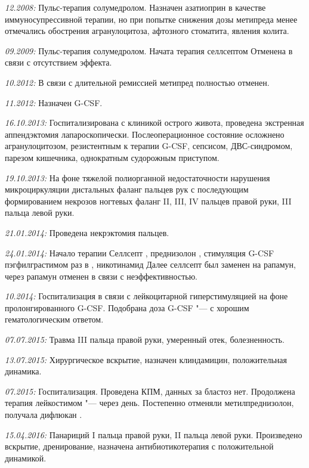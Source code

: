 \documentclass[a4paper,14pt]{extarticle}
\newcommand{\mug}{мкг}
\newcommand{\mgpkg}{мг/кг}
\newcommand{\mgpd}{мг/сут.}
\newcommand{\mugpkg}{мкг/кг}
\newcommand{\months}{мес.}
\newcommand{\weeks}{нед.}
\newcommand{\pdate}[1]{\emph{#1:} }
\begin{document}
\pdate{12.2008} Пульс-терапия солумедролом. Назначен азатиоприн \numprint[\mgpkg]{2} в качестве иммуносупрессивной терапии, но при попытке снижения дозы метипреда менее \numprint[\mgpkg]{3--4} отмечались обострения агранулоцитоза, афтозного стоматита, явления колита.

\pdate{09.2009} Пульс-терапия солумедролом. Начата терапия селлсептом \numprint[\mgpd]{750} Отменена в связи с отсутствием эффекта.

\pdate{10.2012} В связи с длительной ремиссией метипред полностью отменен.

\pdate{11.2012} Назначен G-CSF.

\pdate{16.10.2013} Госпитализирована с клиникой острого живота, проведена экстренная аппендэктомия лапароскопически. Послеоперационное состояние осложнено агранулоцитозом, резистентным к терапии G-CSF, сепсисом, ДВС\hyp{}синдромом, парезом кишечника, однократным судорожным приступом.

\pdate{19.10.2013} На фоне тяжелой полиорганной недостаточности нарушения микроциркуляции дистальных фаланг пальцев рук с последующим формированием некрозов ногтевых фаланг II, III, IV пальцев правой руки, III пальца левой руки.

\pdate{21.01.2014} Проведена некрэктомия пальцев.

\pdate{24.01.2014} Начало терапии Селлсепт \numprint[\mgpd]{1000}, преднизолон \numprint[\mgpd]{7.5}, стимуляция G-CSF пэгфилграстимом  раз в \numprint[\weeks]{2}, никотинамид \numprint[\mgpd]{400} Далее селлсепт был заменен на рапамун, через \numprint[\months]{3} рапамун отменен в связи с неэффективностью.

\pdate{10.2014} Госпитализация в связи с лейкоцитарной гиперстимуляцией на фоне пролонгированного G-CSF. Подобрана доза G-CSF "--- \numprint[\mugpkg]{1} с хорошим гематологическим ответом.

\pdate{07.07.2015} Травма III пальца правой руки, умеренный отек, болезненность.

\pdate{13.07.2015} Хирургическое вскрытие, назначен клиндамицин, положительная динамика.

\pdate{07.2015} Госпитализация. Проведена КПМ, данных за бластоз нет. Продолжена терапия лейкостимом \numprint[\mugpkg]{5} "--- \numprint[\mug]{150} через день. Постепенно отменяли метилпреднизолон, получала дифлюкан \numprint[\mgpd]{100}.

\pdate{15.04.2016} Панариций I пальца правой руки, II пальца левой руки. Произведено вскрытие, дренирование, назначена антибиотикотерапия с положительной динамикой.
\end{document}
